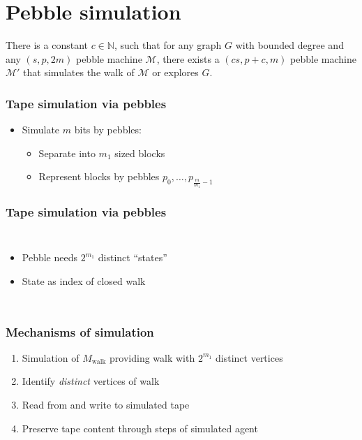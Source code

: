 \documentclass{beamer}
\begin{document}
\section{Pebble simulation}
\begin{frame}
  \begin{theorem}
    There is a constant $c\in\mathbb{N}$, such that for any graph $G$
    with bounded degree and any $(s,p,2m)$ pebble machine $\mathcal{M}$, there
    exists a $(cs,p+c,m)$ pebble machine $\mathcal{M}'$ that simulates the walk
    of $\mathcal{M}$ or explores $G$.
  \end{theorem}
\end{frame}

\begin{frame}
  \frametitle{Tape simulation via pebbles}
  \begin{itemize}
    \item Simulate $m$ bits by pebbles:
      \begin{itemize}
        \item<3-> Separate into $m_{1}$ sized blocks
        \item<4-> Represent blocks by pebbles
          $p_{0},\dots,p_{\frac{m}{m_{1}}-1}$
      \end{itemize}
  \end{itemize}
\end{frame}

\begin{frame}
  \frametitle{Tape simulation via pebbles}
  
  \begin{columns}
    \begin{itemize}
      \item Pebble needs $2^{m_{1}}$ distinct \enquote{states}
      \item State as index of closed walk
    \end{itemize}
    \resizebox{\textwidth}{!}{}
  \end{columns}
\end{frame}

\begin{frame}
  \frametitle{Mechanisms of simulation}
  \begin{enumerate}
    \item Simulation of $M_{\text{walk}}$ providing walk with $2^{m_{1}}$
      distinct vertices
    \item Identify \emph{distinct} vertices of walk
    \item Read from and write to simulated tape
    \item Preserve tape content through steps of simulated agent
  \end{enumerate}
\end{frame}
\end{document}
